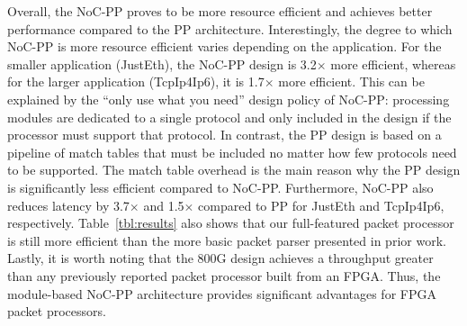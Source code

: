 

Overall, the NoC-PP proves to be more resource efficient and achieves better performance compared to the PP architecture.
Interestingly, the degree to which NoC-PP is more resource efficient varies depending on the application.
For the smaller application (JustEth), the NoC-PP design is 3.2$\times$ more efficient, whereas for the larger application (TcpIp4Ip6), it is 1.7$\times$ more efficient.
This can be explained by the ``only use what you need'' design policy of NoC-PP: processing modules are dedicated to a single protocol and only included in the design if the processor must support that protocol.
In contrast, the PP design is based on a pipeline of match tables that must be included no matter how few protocols need to be supported.
The match table overhead is the main reason why the PP design is significantly less efficient compared to NoC-PP.
Furthermore, NoC-PP also reduces latency by 3.7$\times$ and 1.5$\times$ compared to PP for JustEth and TcpIp4Ip6, respectively.
Table~\ref{tbl:results} also shows that our full-featured packet processor is still more efficient than the more basic packet parser presented in prior work.
Lastly, it is worth noting that the 800G design achieves a throughput greater than any previously reported packet processor built from an FPGA.
Thus, the module-based NoC-PP architecture provides significant advantages for FPGA packet processors.



